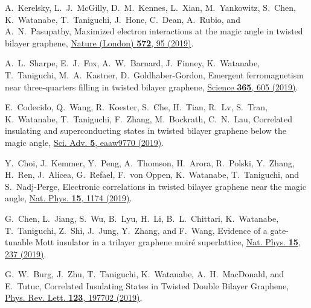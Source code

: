 \documentclass[twocolumn,english,prl,floatfix,citeautoscript,nofootinbib]{revtex4}
\begin{document}
\begin{thebibliography}{999}
 A.~Kerelsky, L.~J.~McGilly, D.~M.~Kennes, L.~Xian,
M.~Yankowitz, S.~Chen, K.~Watanabe, T.~Taniguchi, J.~Hone, C.~Dean,
A.~Rubio, and A.~N.~Pasupathy, Maximized electron interactions at the magic
angle in twisted bilayer graphene, \href{https://doi.org/10.1038/s41586-019-1431-9}%
{Nature (London) \textbf{572}, 95 (2019)}.

 A.~L.~Sharpe, E.~J.~Fox, A.~W.~Barnard, J.~Finney,
K.~Watanabe, T.~Taniguchi, M.~A.~Kastner, D.~Goldhaber-Gordon, Emergent
ferromagnetism near three-quarters filling in twisted bilayer graphene,
\href{https://doi.org/10.1126/science.aaw3780}{Science \textbf{365}, 605
(2019)}.

 E.~Codecido, Q.~Wang, R.~Koester, S.~Che, H.~Tian,
R.~Lv, S.~Tran, K.~Watanabe, T.~Taniguchi, F.~Zhang, M.~Bockrath, C.~N.~Lau,
Correlated insulating and superconducting states in twisted bilayer graphene
below the magic angle, \href{https://doi.org/10.1126/sciadv.aaw9770}{Sci.
Adv. \textbf{5}, eaaw9770 (2019)}.

 Y.~Choi, J.~Kemmer, Y.~Peng, A.~Thomson,
H.~Arora, R.~Polski, Y.~Zhang, H.~Ren, J.~Alicea, G.~Refael, F.~von Oppen,
K.~Watanabe, T.~Taniguchi, and S.~Nadj-Perge, Electronic correlations in
twisted bilayer graphene near the magic angle, \href{https://doi.org/10.1038/s41567-019-0606-5}%
{Nat. Phys. \textbf{15}, 1174 (2019)}.

 G.~Chen, L.~Jiang, S.~Wu, B.~Lyu, H.~Li,
B.~L.~Chittari, K.~Watanabe, T.~Taniguchi, Z.~Shi, J.~Jung, Y.~Zhang, and
F.~Wang, Evidence of a gate-tunable Mott insulator in a trilayer graphene
moir\'e superlattice, \href{https://doi.org/10.1038/s41567-018-0387-2}{Nat.
Phys. \textbf{15}, 237 (2019)}.






 G.~W.~Burg, J.~Zhu, T.~Taniguchi,
K.~Watanabe, A.~H.~MacDonald, and E.~Tutuc, Correlated Insulating States in
Twisted Double Bilayer Graphene, \href{https://doi.org/10.1103/PhysRevLett.123.197702}%
{Phys. Rev. Lett. \textbf{123}, 197702 (2019)}.




\end{thebibliography}
\end{document}
